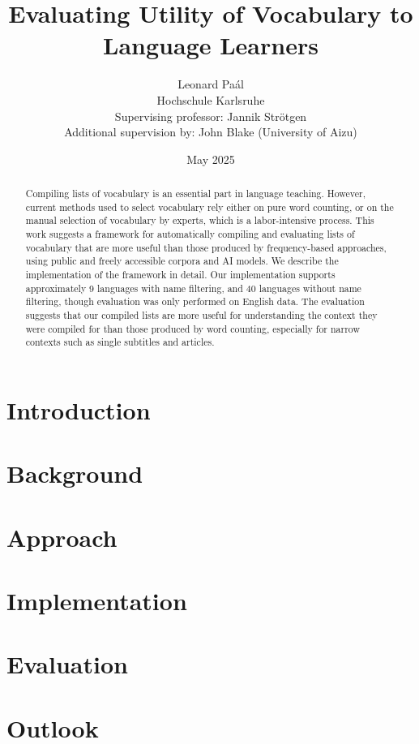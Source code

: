 \documentclass[12pt]{report}
\title{Evaluating Utility of Vocabulary to Language Learners}
\author{Leonard Paál\\Hochschule Karlsruhe\\Supervising professor: Jannik Strötgen\\Additional supervision by: John Blake (University of Aizu)}
\date{May 2025}
\begin{document}
\maketitle
\begin{abstract}
	Compiling lists of vocabulary is an essential part in language teaching.
	However, current methods used to select vocabulary rely either on pure word counting, or on the manual selection of vocabulary by experts, which is a labor-intensive process.
	This work suggests a framework for automatically compiling and evaluating lists of vocabulary that are more useful than those produced by frequency-based approaches, using public and freely accessible corpora and AI models.
	We describe the implementation of the framework in detail.
	Our implementation supports approximately 9 languages with name filtering, and 40 languages without name filtering, though evaluation was only performed on English data.
	The evaluation suggests that our compiled lists are more useful for understanding the context they were compiled for than those produced by word counting, especially for narrow contexts such as single subtitles and articles.
\end{abstract}

\clearpage
\tableofcontents
\clearpage

\chapter{Introduction} \label{ch:intro}

\chapter{Background} \label{ch:background}

\chapter{Approach} \label{ch:approach}

\chapter{Implementation} \label{ch:implementation}

\chapter{Evaluation} \label{ch:evaluation}

\chapter{Outlook} \label{ch:outlook}


% 



\end{document}
